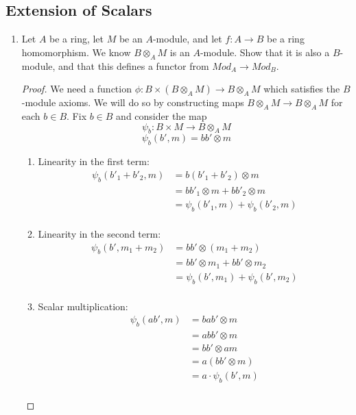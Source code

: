 \documentclass[hidelinks,12pt]{article}
\begin{document}
\subsection{Extension of Scalars}
\begin{enumerate}[label=(\alph*).]
    \item Let \(A\) be a ring, let \(M\) be an \(A\)-module, and let \(f:A\to B\) be a ring homomorphism. We know \(B\otimes_{A}M\) is an \(A\)-module. Show that it is also a \(B\)-module, and that this defines a functor from \(Mod_{A}\to Mod_{B}\).
\begin{proof}
We need a function \(\phi:B\times(B\otimes_{A}M)\to B\otimes_{A}M\) which satisfies the \(B\)-module axioms. We will do so by constructing maps \(B\otimes_{A}M\to B\otimes_{A}M\) for each \(b\in B\). Fix \(b\in B\) and consider the map\pagebreak \[
\psi_{b}:B\times M\to B\otimes_{A}M
\]
\[
\psi_{b}(b',m)=bb'\otimes m
\]
\begin{enumerate}[label=(\roman*).]
    \item Linearity in the first term: 
        \begin{align*}
        \psi_{b}(b'_{1}+b'_{2},m)&=b(b'_{1}+b'_{2})\otimes m\\
        &=bb'_{1}\otimes m+bb'_{2}\otimes m\\
        &=\psi_{b}(b'_{1},m)+\psi_{b}(b'_{2},m)\\
        \end{align*}
    \item Linearity in the second term:
        \begin{align*}
        \psi_{b}(b',m_{1}+m_{2})&=bb'\otimes (m_{1}+m_{2})\\
        &=bb'\otimes m_{1}+bb'\otimes m_{2}\\
        &=\psi_{b}(b',m_{1})+\psi_{b}(b',m_{2})\\
        \end{align*}
    \item Scalar multiplication:
        \begin{align*}
        \psi_{b}(ab',m)&=bab'\otimes m\\
                       &=abb'\otimes m\tag{Rings commutative by convention}\\
                       &=bb'\otimes am\\
                       &=a(bb'\otimes m)\\
        &=a\cdot \psi_{b}(b',m)\\
        \end{align*}

\end{enumerate}
\end{proof}
\end{enumerate}
\end{document}

